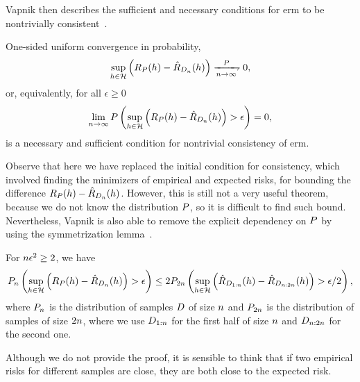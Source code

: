Vapnik then describes the sufficient and necessary conditions for \acrshort{erm} to be nontrivially consistent~\citep{Vapnik00}.
\begin{theorem}
    One-sided uniform convergence in probability, 
    \begin{equation}
        \nonumber
        \sup_{\hypf \in \hypspace} \left(\exprisk(\hypf) - \empriskn(\hypf) \right) \xrightharpoondown[\nsamples \to \infty]{\distf}  0,
    \end{equation}    
    or, equivalently, for all $\epsilon \geq 0$
    \begin{equation}
        \nonumber
        \lim_{n \to \infty} P\left(\sup_{h \in \mathcal{H}} \left(R_P(h) - \hat{R}_{D_{n}}(h) \right) > \epsilon \right) = 0,
    \end{equation}
    is a necessary and sufficient condition for nontrivial consistency of \acrshort{erm}.
\end{theorem}
Observe that here we have replaced the initial condition for consistency, which involved finding the minimizers of empirical and expected risks, for bounding the difference $R_P(h) - \hat{R}_{D_{n}}(h)$.
However, this is still not a very useful theorem, because we do not know the distribution $P$, so it is difficult to find such bound.
Nevertheless, Vapnik is also able to remove the explicit dependency on $P$ by using the symmetrization lemma~\citep{vapnik1982estimation}.
\begin{lemma}[Symmetrization]\label{lemma:symetrization}
    For $n \epsilon^2 \geq 2$, we have 
    \begin{equation}
        \nonumber
        P_{n}\left(\sup_{h \in \mathcal{H}} \left(R_P(h) - \hat{R}_{D_{n}}(h) \right) > \epsilon \right) 
        \leq 
        2P_{2 n} \left(\sup_{h \in \mathcal{H}} \left(\hat{R}_{D_{1:n}}(h) - \hat{R}_{D_{n: 2n}}(h) \right) > \epsilon/2 \right),
    \end{equation}
    where $P_{n}$ is the distribution of samples $D$ of size $n$ and $P_{2 n}$ is the distribution of samples of size $2 n$, where we use $D_{1:n}$ for the first half of size $n$ and $D_{n: 2n}$ for the second one.
\end{lemma}
Although we do not provide the proof, it is sensible to think that if two empirical risks for different samples are close, they are both close to the expected risk.
